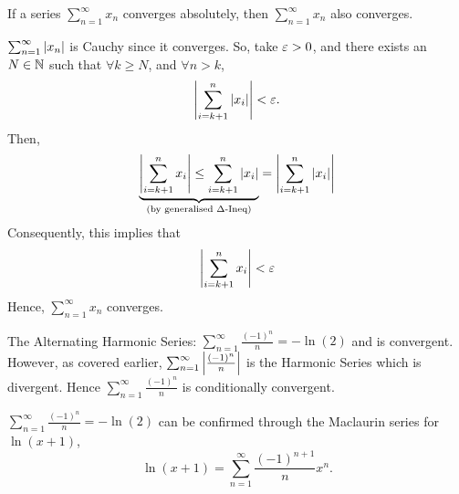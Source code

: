 \documentclass[12pt]{article}
\theoremstyle{definition}
\renewenvironment{proof}[1][\proofname]{\vspace{-10pt}\begin{replacementproof}}{\end{replacementproof}}
\newcommand{\xseries}{\sum_{n = 1}^{\infty}x_{n}}
\begin{document}
            \begin{prop}
                If a series $\xseries$ converges absolutely, then $\xseries$ also converges. 
            \end{prop}
            \begin{proof}
                $\sum_{n = 1}^{\infty}\left|x_{n}\right|$ is Cauchy since it converges. So, take $\varepsilon > 0$, and there exists an $N \in \mathbb{N}$ such that $\forall k \geq N$, and $\forall n > k$, 
                \begin{equation*}
                    \left|\sum_{i = k + 1}^{n}\left|x_{i}\right|\right| < \varepsilon.
                \end{equation*}
                Then, 
                \begin{equation*}
                    \underbrace{\left|\sum_{i = k + 1}^{n}x_{i}\right| \leq \sum_{i = k + 1}^{n}\left|x_{i}\right|}_{\text{(by generalised $\Delta$-Ineq)}} = \left|\sum_{i = k + 1}^{n}\left|x_{i}\right|\right|
                \end{equation*}
                Consequently, this implies that 
                \begin{equation*}
                    \left|\sum_{i = k + 1}^{n}x_{i}\right| < \varepsilon
                \end{equation*}
                Hence, $\xseries$ converges.
            \end{proof}
            \begin{eg}
                The Alternating Harmonic Series: $\sum_{n = 1}^{\infty}\frac{(-1)^{n}}{n} = -\ln(2)$ and is convergent. 
                However, as covered earlier, $\sum_{n = 1}^{\infty}\left|\frac{(-1)^{n}}{n}\right|$ is the Harmonic Series which is divergent. Hence $\sum_{n = 1}^{\infty}\frac{(-1)^{n}}{n}$ is conditionally convergent.

                \begin{note}
                    $\sum_{n = 1}^{\infty}\frac{(-1)^{n}}{n} = -\ln(2)$ can be confirmed through the Maclaurin series for $\ln(x + 1)$, 
                    \begin{equation*}
                        \ln(x + 1) = \sum_{n = 1}^{\infty}\frac{(-1)^{n + 1}}{n}x^{n}.
                    \end{equation*}
                \end{note}
            \end{eg}
\end{document}
